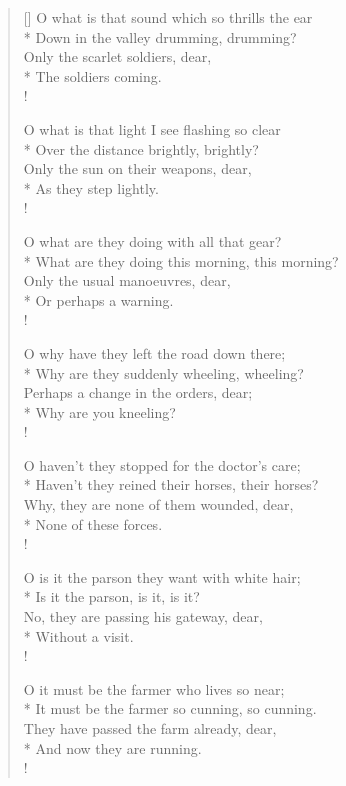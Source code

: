 \documentclass[MAIN]{subfiles}
\begin{document}
\settowidth{\versewidth}{O what is that sound which so thrills the ear}
\begin{verse}[\versewidth]
O what is that sound which so thrills the ear\\*
\vin Down in the valley drumming, drumming?\\
Only the scarlet soldiers, dear,\\*
\vin \vin The soldiers coming.\\!

O what is that light I see flashing so clear\\*
\vin Over the distance brightly, brightly?\\
Only the sun on their weapons, dear,\\*
\vin \vin As they step lightly.\\!

O what are they doing with all that gear?\\*
\vin What are they doing this morning, this morning?\\
Only the usual manoeuvres, dear,\\*
\vin \vin Or perhaps a warning.\\!

O why have they left the road down there;\\*
\vin Why are they suddenly wheeling, wheeling?\\
Perhaps a change in the orders, dear;\\*
\vin \vin Why are you kneeling?\\!

O haven't they stopped for the doctor's care;\\*
\vin Haven't they reined their horses, their horses?\\
Why, they are none of them wounded, dear,\\*
\vin \vin None of these forces.\\!

O is it the parson they want with white hair;\\*
\vin Is it the parson, is it, is it?\\
No, they are passing his gateway, dear,\\*
\vin \vin Without a visit.\\!

O it must be the farmer who lives so near;\\*
\vin It must be the farmer so cunning, so cunning.\\
They have passed the farm already, dear,\\*
\vin \vin And now they are running.\\!


\end{verse}
\end{document}
